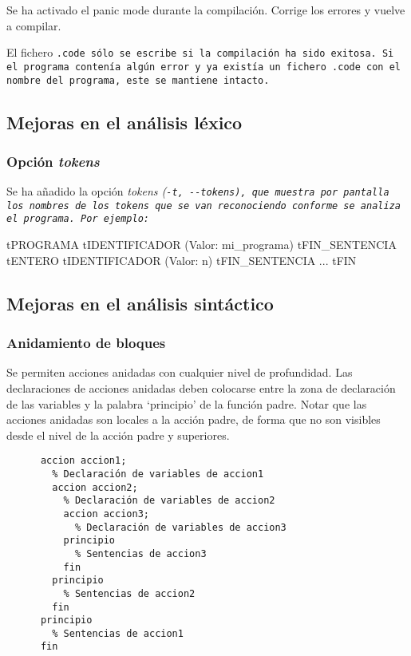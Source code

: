 \begin{codigo}
Se ha activado el panic mode durante la compilación. Corrige los errores y vuelve a compilar.
\end{codigo}

El fichero \tt{.code} sólo se escribe si la compilación ha sido exitosa. Si el programa contenía algún error y ya existía un fichero \tt{.code} con el nombre del programa, este se mantiene intacto.

\subsection{Mejoras en el análisis léxico}
\subsubsection{Opción \it{tokens}}
Se ha añadido la opción \it{tokens} (\tt{-t}, \tt{-{}-tokens}), que muestra por pantalla los nombres de los tokens que se van reconociendo conforme se analiza el programa. Por ejemplo:

\begin{codigo}
tPROGRAMA
tIDENTIFICADOR (Valor: mi_programa)
tFIN_SENTENCIA
tENTERO
tIDENTIFICADOR (Valor: n)
tFIN_SENTENCIA
...
tFIN
\end{codigo}

\subsection{Mejoras en el análisis sintáctico}
\subsubsection{Anidamiento de bloques}
Se permiten acciones anidadas con cualquier nivel de profundidad. Las declaraciones de acciones
anidadas deben colocarse entre la zona de declaración de las variables y la palabra `principio' de la
función padre. Notar que las acciones anidadas son locales a la acción padre, de forma que no son visibles desde el nivel de la acción padre y superiores.

  \begin{verbatim}
      accion accion1;
        % Declaración de variables de accion1
        accion accion2;
          % Declaración de variables de accion2
          accion accion3;
            % Declaración de variables de accion3
          principio
            % Sentencias de accion3
          fin
        principio
          % Sentencias de accion2
        fin
      principio
        % Sentencias de accion1
      fin
  \end{verbatim}

